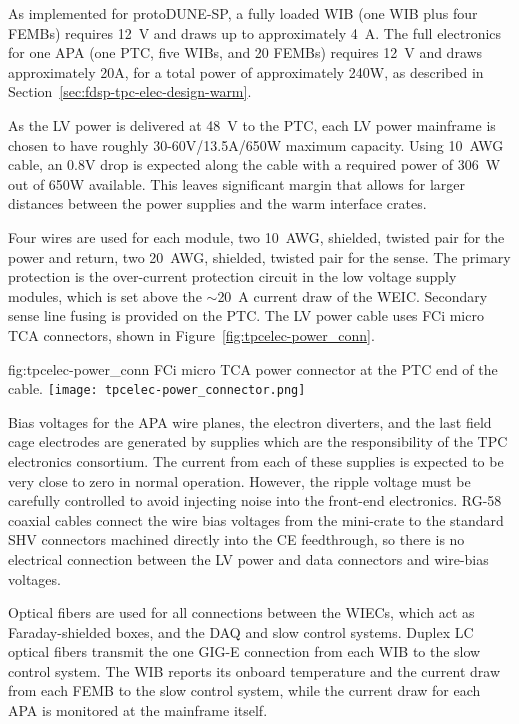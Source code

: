 As implemented for protoDUNE-SP, a fully loaded WIB (one WIB plus four FEMBs) requires
12~V and draws up to approximately 4~A. The full electronics for one APA (one PTC, five WIBs, and 20 FEMBs) 
requires 12~V and draws approximately 20A, for a total power of approximately 240W, as 
described in Section~\ref{sec:fdsp-tpc-elec-design-warm}.

As the LV power is delivered at 48~V to the PTC, each LV power mainframe is chosen to have roughly 30-60V/13.5A/650W maximum capacity. Using 10~AWG cable, an 0.8V drop is expected along the cable with a
required power of 306~W out of 650W available.  This leaves significant margin that allows for larger distances between the power supplies and the warm interface crates.

Four wires are used for each module, two 10~AWG,
shielded, twisted pair for the power and return, two 20~AWG, shielded, twisted pair for the sense.
The primary protection is the over-current protection circuit in the low voltage supply modules, which is set above the $\sim$20~A current draw of the WEIC.  Secondary sense line fusing is provided on the PTC.  The LV power cable uses FCi micro TCA connectors, shown in
Figure~\ref{fig:tpcelec-power_conn}.

\begin{dunefigure}
{fig:tpcelec-power_conn}
{FCi micro TCA power connector at the PTC end of the cable.}
\texttt{[image: tpcelec-power\_connector.png]}
\end{dunefigure}

Bias voltages for the APA wire planes, the electron diverters, and the last field cage electrodes are generated by supplies which are the responsibility of the TPC electronics consortium.  The current from each of these supplies is expected to be very close to zero in normal operation.  However, the ripple voltage must be carefully controlled to avoid injecting noise into the front-end electronics.  RG-58 coaxial cables connect the wire bias voltages from the mini-crate to the standard SHV
connectors machined directly into the CE feedthrough, so there is no electrical connection between 
the LV power and data connectors and wire-bias voltages.

Optical fibers are used for all connections between the WIECs, which act as
Faraday-shielded boxes, and the DAQ and slow control systems.  Duplex LC optical fibers
transmit the one GIG-E connection from each WIB to the slow control system.  The WIB reports
its onboard temperature and the current draw from each FEMB to the slow control system, while the
current draw for each APA is monitored at the mainframe itself.
